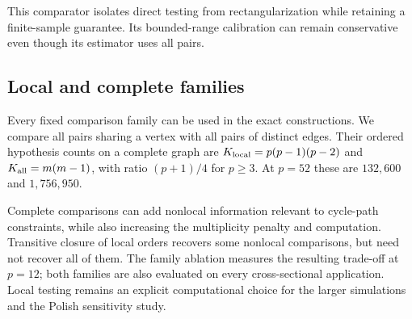 This comparator isolates direct testing from rectangularization while retaining a finite-sample guarantee. Its bounded-range calibration can remain conservative even though its estimator uses all pairs.

\subsection{Local and complete families}
Every fixed comparison family can be used in the exact constructions. We compare all pairs sharing a vertex with all pairs of distinct edges. Their ordered hypothesis counts on a complete graph are $K_{\rm local}=p(p-1)(p-2)$ and $K_{\rm all}=m(m-1)$, with ratio $(p+1)/4$ for $p\ge3$. At $p=52$ these are $132{,}600$ and $1{,}756{,}950$.

Complete comparisons can add nonlocal information relevant to cycle-path constraints, while also increasing the multiplicity penalty and computation. Transitive closure of local orders recovers some nonlocal comparisons, but need not recover all of them. The family ablation measures the resulting trade-off at $p=12$; both families are also evaluated on every cross-sectional application. Local testing remains an explicit computational choice for the larger simulations and the Polish sensitivity study.
